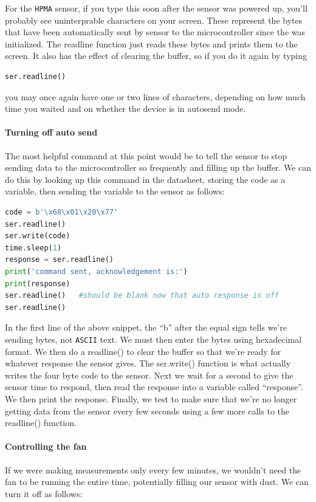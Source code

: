 For the \texttt{HPMA} sensor, if you type this soon after the sensor was powered up, you’ll probably see uninterprable characters on your screen.
These represent the bytes that have been automatically sent by sensor to the microcontroller since the \uart was initialized.
The readline function just reads these bytes and prints them to the screen. It also has the effect of clearing the buffer, so if you do it again by typing

\begin{lstlisting}[language=Python]
ser.readline()
\end{lstlisting}

you may once again have one or two lines of characters, depending on how much time you waited and on whether the device is in autosend mode.

\paragraph{Turning off auto send}
The most helpful command at this point would be to tell the sensor to stop sending data to the microcontroller so frequently and filling up the \uart buffer.
We can do this by looking up this command in the datasheet, storing the code as a variable, then sending the variable to the sensor as follows:

\begin{lstlisting}[language=Python]
code = b'\x68\x01\x20\x77'
ser.readline()
ser.write(code)
time.sleep(1)
response = ser.readline()
print('command sent, acknowledgement is:')
print(response)
ser.readline()   #should be blank now that auto response is off
ser.readline()
\end{lstlisting}

In the first line of the above snippet, the “b” after the equal sign tells \Micropython we’re sending bytes, not \texttt{ASCII} text.
We must then enter the bytes using hexadecimal format.  We then do a readline() to clear the buffer so that we’re ready for whatever response the sensor gives.
The ser.write() function is what actually writes the four byte code to the sensor.
Next we wait for a second to give the sensor time to respond, then read the response into a variable called “response”.
We then print the response.  Finally, we test to make sure that we’re no longer getting data from the sensor every few seconds using a few more calls to the readline() function.

\paragraph{Controlling the fan}
If we were making measurements only every few minutes, we wouldn’t need the fan to be running the entire time, potentially filling our sensor with dust.  We can turn it off as follows:

